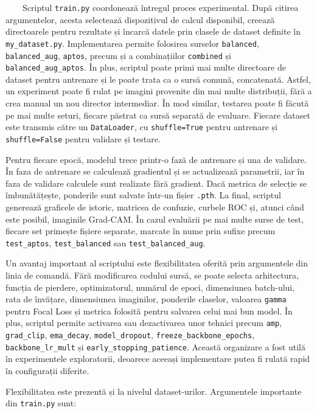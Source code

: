 \documentclass[12pt, a4paper, twoside, romanian]{teza-upb}
\begin{document}
\ \ \ \ Scriptul \texttt{train.py} coordonează întregul proces experimental. După citirea argumentelor, acesta selectează dispozitivul
de calcul disponibil, creează directoarele pentru rezultate și încarcă datele prin clasele
de dataset definite în \texttt{my\_dataset.py}. Implementarea permite folosirea surselor \texttt{balanced}, \texttt{balanced\_aug}, \texttt{aptos},
precum și a combinațiilor \texttt{combined} și \texttt{balanced\_aug\_aptos}. În plus, scriptul poate primi
mai multe directoare de dataset pentru antrenare și le poate trata ca o sursă comună,
concatenată. Astfel, un experiment poate fi rulat pe imagini provenite din mai multe distribuții,
fără a crea manual un nou director intermediar. În mod similar, testarea poate fi făcută pe
mai multe seturi, fiecare păstrat ca sursă separată de evaluare. Fiecare dataset este transmis
către un \texttt{DataLoader}, cu \texttt{shuffle=True} pentru antrenare și \texttt{shuffle=False}
pentru validare și testare.
\bigskip

Pentru fiecare epocă, modelul trece printr-o fază de antrenare și una de
validare. În faza de antrenare se calculează gradientul și se actualizează parametrii,
iar în faza de validare calculele sunt realizate fără gradient. Dacă metrica
de selecție se îmbunătățește, ponderile sunt salvate într-un fișier \texttt{.pth}. La final,
scriptul generează graficele de istoric, matricea de confuzie, curbele ROC și, atunci
când este posibil, imaginile Grad-CAM. În cazul evaluării pe mai multe surse
de test, fiecare set primește fișiere separate, marcate în nume prin sufixe
precum \texttt{test\_aptos}, \texttt{test\_balanced} sau \texttt{test\_balanced\_aug}.
\bigskip

Un avantaj important al scriptului este flexibilitatea oferită prin argumentele din linia de
comandă. Fără modificarea codului sursă, se poate selecta arhitectura, funcția de pierdere,
optimizatorul, numărul de epoci, dimensiunea batch-ului, rata de învățare, dimensiunea imaginilor,
ponderile claselor, valoarea \texttt{gamma} pentru Focal Loss și metrica folosită pentru salvarea
celui mai bun model. În plus, scriptul permite activarea sau dezactivarea unor tehnici precum
\texttt{amp}, \texttt{grad\_clip}, \texttt{ema\_decay},
\texttt{model\_dropout}, \texttt{freeze\_backbone\_epochs}, \texttt{backbone\_lr\_mult} și
\texttt{early\_stopping\_patience}. Această organizare a fost utilă în experimentele exploratorii,
deoarece aceeași implementare putea fi rulată rapid în configurații diferite.
\bigskip

Flexibilitatea este prezentă și la nivelul dataset-urilor. Argumentele importante din
\texttt{train.py} sunt:
\end{document}
